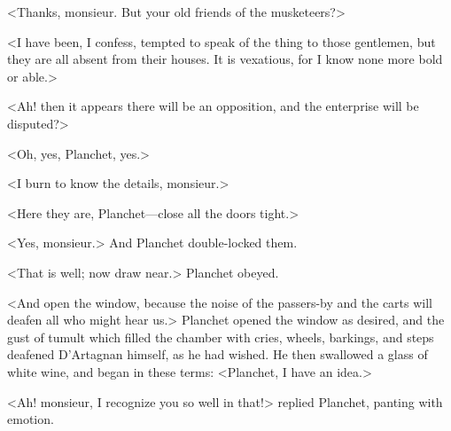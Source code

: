 <Thanks, monsieur. But your old friends of the musketeers?>

<I have been, I confess, tempted to speak of the thing to those gentlemen, but they are all absent from their houses. It is vexatious, for I know none more bold or able.>

<Ah! then it appears there will be an opposition, and the enterprise will be disputed?>

<Oh, yes, Planchet, yes.>

<I burn to know the details, monsieur.>

<Here they are, Planchet—close all the doors tight.>

<Yes, monsieur.> And Planchet double-locked them.

<That is well; now draw near.> Planchet obeyed.

<And open the window, because the noise of the passers-by and the carts will deafen all who might hear us.> Planchet opened the window as desired, and the gust of tumult which filled the chamber with cries, wheels, barkings, and steps deafened D'Artagnan himself, as he had wished. He then swallowed a glass of white wine, and began in these terms: <Planchet, I have an idea.>

<Ah! monsieur, I recognize you so well in that!> replied Planchet, panting with emotion. 